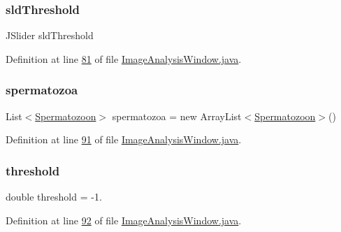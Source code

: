 \subsubsection{\texorpdfstring{sld\+Threshold}{sldThreshold}}
{\footnotesize\ttfamily J\+Slider sld\+Threshold\hspace{0.3cm}{\ttfamily [protected]}}



Definition at line \hyperlink{_image_analysis_window_8java_source_l00081}{81} of file \hyperlink{_image_analysis_window_8java_source}{Image\+Analysis\+Window.\+java}.

\hypertarget{classgui_1_1_image_analysis_window_a7c449117b5c92c9b56bf822526a37da3}{}\label{classgui_1_1_image_analysis_window_a7c449117b5c92c9b56bf822526a37da3} 
\subsubsection{\texorpdfstring{spermatozoa}{spermatozoa}}
{\footnotesize\ttfamily List$<$\hyperlink{classdata_1_1_spermatozoon}{Spermatozoon}$>$ spermatozoa = new Array\+List$<$\hyperlink{classdata_1_1_spermatozoon}{Spermatozoon}$>$()\hspace{0.3cm}{\ttfamily [protected]}}



Definition at line \hyperlink{_image_analysis_window_8java_source_l00091}{91} of file \hyperlink{_image_analysis_window_8java_source}{Image\+Analysis\+Window.\+java}.

\hypertarget{classgui_1_1_image_analysis_window_afcfbedec6ebde62c6a091ce335836ef1}{}\label{classgui_1_1_image_analysis_window_afcfbedec6ebde62c6a091ce335836ef1} 
\subsubsection{\texorpdfstring{threshold}{threshold}}
{\footnotesize\ttfamily double threshold = -\/1.\hspace{0.3cm}{\ttfamily [protected]}}



Definition at line \hyperlink{_image_analysis_window_8java_source_l00092}{92} of file \hyperlink{_image_analysis_window_8java_source}{Image\+Analysis\+Window.\+java}.

